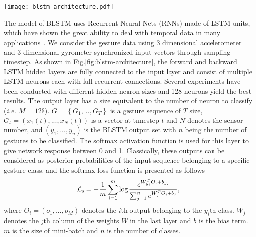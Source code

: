 \documentclass[review]{elsarticle}
\begin{document}
\begin{figure*}
	\centering
	\texttt{[image: blstm-architecture.pdf]}
	\caption{{The architecture of F-BLSTM. We intuitively change the loss function of BLSTM, and the resulting algorithm does not affect the training convergence and the model size, but leading to a performance improvement.}}
	\label{fig:blstm-architecture}
\end{figure*}

The model of {BLSTM uses Recurrent Neural Nets (RNNs)} made of LSTM units, which have shown the great ability to deal with temporal data in many applications~\cite{sundermeyer2012lstm}. We consider the gesture data using 3 dimensional accelerometer and 3 dimensional gyrometer synchronized input vectors through sampling timestep. As shown in Fig.\;\ref{fig:blstm-architecture}, the forward and backward LSTM hidden layers are fully connected to the input layer and consist of multiple LSTM neurons each with full recurrent connections. Several experiments have been conducted with different hidden neuron sizes and 128 neurons yield the best results. The output layer has a size equivalent to the number of neuron to classify (\emph{i.e.} $M=128$). $G = \left\{ {G_1,...,G_{T}} \right\}$ is a gesture sequence of $T$ size, $G_t = \left(x_1\left(t\right),...,x_{N}\left(t\right)\right)$ is a vector at timestep $t$ and $N$ denotes the sensor number, and $\left(y_1,...,y_{n}\right)$ is the BLSTM output set with $n$ being the number of gestures to be classified. The softmax activation function is used for this layer to give network response between 0 and 1. Classically, these outputs can be considered as posterior probabilities of the input sequence belonging to a specific gesture class, and the softmax loss function is presented as follows
\begin{equation}{\cal L}_s =  - \frac{1}{m} \sum\limits_{i = 1}^m \log \frac{{{e^{W_{{y_i}}^T{O_i} + {b_{{y_{i}}}}}}}}{{\sum\nolimits_{j = 1}^n {{e^{W_j^T{O_i} + {b_j}}}} }},
	\label{eq:softmaxloss}
\end{equation}
where $O_i =\left(o_1,...,o_M\right)$ denotes the {$i$th output belonging to the $y_i$th class}. $W_j$ denotes the $j$th column of the weights $W$ in the last layer and $b$ is the bias term. $m$ is the size of mini-batch and $n$ is the number of classes.


\end{document}
